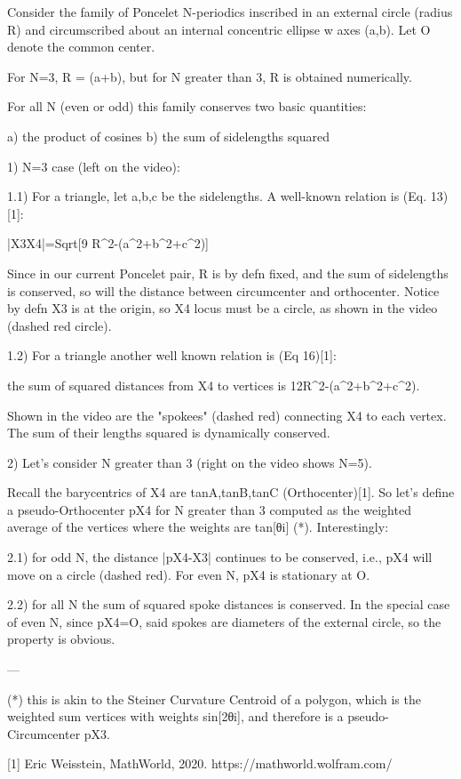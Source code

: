 Consider the family of Poncelet N-periodics inscribed in an external circle (radius R) and circumscribed about an internal concentric ellipse w axes (a,b). Let O denote the common center.

For N=3, R = (a+b), but for N greater than 3, R is obtained numerically. 

For all N (even or odd) this family conserves two basic quantities:

a) the product of cosines
b) the sum of sidelengths squared

1) N=3 case (left on the video):

1.1) For a triangle, let a,b,c be the sidelengths. A well-known relation is (Eq. 13)[1]:

|X3X4|=Sqrt[9 R^2-(a^2+b^2+c^2)]

Since in our current Poncelet pair, R is by defn fixed, and the sum of sidelengths is conserved, so will the distance between circumcenter and orthocenter.  Notice by defn X3 is at the origin, so X4 locus must be a circle, as shown in the video (dashed red circle). 

1.2) For a triangle another well known relation is (Eq 16)[1]:

the sum of squared distances from X4 to vertices is 12R^2-(a^2+b^2+c^2).

Shown in the video are the "spokees" (dashed red) connecting X4 to each vertex. The sum of their lengths squared is dynamically conserved.

2) Let's consider N greater than 3 (right on the video shows N=5).

Recall the barycentrics of X4 are tanA,tanB,tanC (Orthocenter)[1]. So let's define a pseudo-Orthocenter pX4 for N greater than 3 computed as the weighted average of the vertices where the weights are tan[θi] (*). Interestingly:

2.1) for odd N, the distance |pX4-X3| continues to be conserved, i.e., pX4 will move on a circle (dashed red). For even N, pX4 is stationary at O.

2.2) for all N the sum of squared spoke distances is conserved. In the special case of even N, since pX4=O, said spokes are diameters of the external circle, so the property is obvious.

---

(*) this is akin to the Steiner Curvature Centroid of a polygon, which is the weighted sum vertices with weights sin[2θi], and therefore is a pseudo-Circumcenter pX3.

[1] Eric Weisstein, MathWorld, 2020. https://mathworld.wolfram.com/